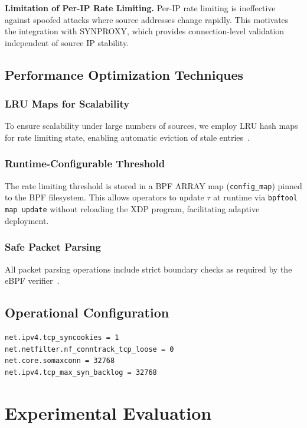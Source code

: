 \documentclass[conference]{IEEEtran}
\begin{document}
\noindent\textbf{Limitation of Per-IP Rate Limiting.}
Per-IP rate limiting is ineffective against spoofed attacks where source
addresses change rapidly.
This motivates the integration with SYNPROXY, which provides
connection-level validation independent of source IP stability.

\subsection{Performance Optimization Techniques}

\subsubsection{LRU Maps for Scalability}
To ensure scalability under large numbers of sources, we employ LRU hash
maps for rate limiting state, enabling automatic eviction of stale
entries~\cite{LinuxKernelDoc}.

\subsubsection{Runtime-Configurable Threshold}
The rate limiting threshold is stored in a BPF ARRAY map
(\texttt{config\_map}) pinned to the BPF filesystem.
This allows operators to update $\tau$ at runtime via \texttt{bpftool map
update} without reloading the XDP program, facilitating adaptive deployment.

\subsubsection{Safe Packet Parsing}
All packet parsing operations include strict boundary checks as required
by the eBPF verifier~\cite{LinuxKernelDoc}.

\subsection{Operational Configuration}

\begin{lstlisting}[language=bash]
net.ipv4.tcp_syncookies = 1
net.netfilter.nf_conntrack_tcp_loose = 0
net.core.somaxconn = 32768
net.ipv4.tcp_max_syn_backlog = 32768
\end{lstlisting}

\section{Experimental Evaluation}
\label{sec:evaluation}
\end{document}
